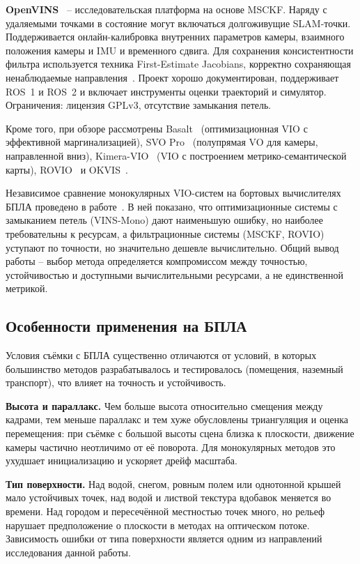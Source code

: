     \textbf{OpenVINS}~\cite{openvins} -- исследовательская платформа на основе MSCKF.
    Наряду с удаляемыми точками в состояние могут включаться долгоживущие SLAM-точки.
    Поддерживается онлайн-калибровка внутренних параметров камеры, взаимного положения камеры и IMU и временного сдвига.
    Для сохранения консистентности фильтра используется техника First-Estimate Jacobians, корректно сохраняющая ненаблюдаемые направления~\cite{vins_consistency}.
    Проект хорошо документирован, поддерживает ROS~1 и ROS~2 и включает инструменты оценки траекторий и симулятор.
    Ограничения: лицензия GPLv3, отсутствие замыкания петель.

    Кроме того, при обзоре рассмотрены Basalt~\cite{basalt} (оптимизационная VIO с эффективной маргинализацией), SVO Pro~\cite{svo2} (полупрямая VO для камеры, направленной вниз), Kimera-VIO~\cite{kimera} (VIO с построением метрико-семантической карты), ROVIO~\cite{rovio} и OKVIS~\cite{okvis}.

    Независимое сравнение монокулярных VIO-систем на бортовых вычислителях БПЛА проведено в работе~\cite{vio_benchmark}.
    В ней показано, что оптимизационные системы с замыканием петель (VINS-Mono) дают наименьшую ошибку, но наиболее требовательны к ресурсам, а фильтрационные системы (MSCKF, ROVIO) уступают по точности, но значительно дешевле вычислительно.
    Общий вывод работы -- выбор метода определяется компромиссом между точностью, устойчивостью и доступными вычислительными ресурсами, а не единственной метрикой.

    \subsection{Особенности применения на БПЛА}

    Условия съёмки с БПЛА существенно отличаются от условий, в которых большинство методов разрабатывалось и тестировалось (помещения, наземный транспорт), что влияет на точность и устойчивость.

    \textbf{Высота и параллакс.}
    Чем больше высота относительно смещения между кадрами, тем меньше параллакс и тем хуже обусловлены триангуляция и оценка перемещения: при съёмке с большой высоты сцена близка к плоскости, движение камеры частично неотличимо от её поворота.
    Для монокулярных методов это ухудшает инициализацию и ускоряет дрейф масштаба.

    \textbf{Тип поверхности.}
    Над водой, снегом, ровным полем или однотонной крышей мало устойчивых точек, над водой и листвой текстура вдобавок меняется во времени.
    Над городом и пересечённой местностью точек много, но рельеф нарушает предположение о плоскости в методах на оптическом потоке.
    Зависимость ошибки от типа поверхности является одним из направлений исследования данной работы.

